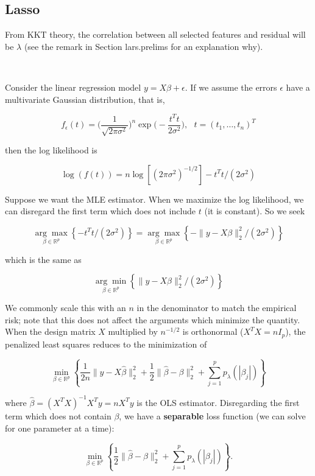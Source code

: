 \subsection{Lasso}

From KKT theory, the correlation between all selected features and residual will be \(\lambda\) (see the remark in Section {lars.prelims} for an explanation why).

\

Consider the linear regression model \(y = X \beta + \epsilon\). If we assume the errors \(\epsilon\) have a multivariate Gaussian distribution, that is,

\[
f_\epsilon(t) = \bigg( \frac{1}{ \sqrt{2\pi \sigma^2}}   \bigg)^n \exp \bigg( - \frac{t^T t}{2 \sigma^2} \bigg) , \ \ \ t = (t_1, \ldots, t_n)^T
\]

then the log likelihood is

\[
\log(f(t)) = n \log[(2 \pi \sigma^2)^{-1/2}] - t^Tt/(2 \sigma^2)
\]

Suppose we want the MLE estimator. When we maximize the log likelihood, we can disregard the first term which does not include \(t\) (it is constant). So we seek

\[
\underset{\beta \in \mathbb{R}^p}{\arg \max} \left\{ -t^Tt/(2 \sigma^2) \right\} = \underset{\beta \in \mathbb{R}^p}{\arg \max}  \left\{- \lVert y - X \beta \rVert_2^2 /(2 \sigma^2) \right\}
\]

which is the same as

\[
\underset{\beta \in \mathbb{R}^p}{\arg \min} \left\{ \lVert y - X \beta \rVert_2^2 /(2 \sigma^2) \right\}
\]

We commonly scale this with an \(n\) in the denominator to match the empirical risk; note that this does not affect the arguments which minimize the quantity. When the design matrix \(X\) multiplied by \(n^{-1/2}\) is orthonormal (\(X^TX = nI_p\)), the penalized least squares reduces to the minimization of 

\[
\min_{\beta \in \mathbb{R}^p} \left\{ \frac{1}{2n} \lVert y - X \hat{\beta} \rVert_2^2 + \frac{1}{2} \lVert \hat{\beta} - \beta \rVert_2^2 + \sum_{j=1}^p p_\lambda ( | \beta_j|)    \right\}
\]

where \(\hat{\beta} = (X^TX)^{-1}X^Ty = nX^T y\) is the OLS estimator. Disregarding the first term which does not contain \(\beta\), we have a \textbf{separable} loss function (we can solve for one parameter at a time):

\[
\min_{\beta \in \mathbb{R}^p} \left\{  \frac{1}{2} \lVert \hat{\beta} - \beta \rVert_2^2 + \sum_{j=1}^p p_\lambda ( | \beta_j|)   \right\}.
\]

